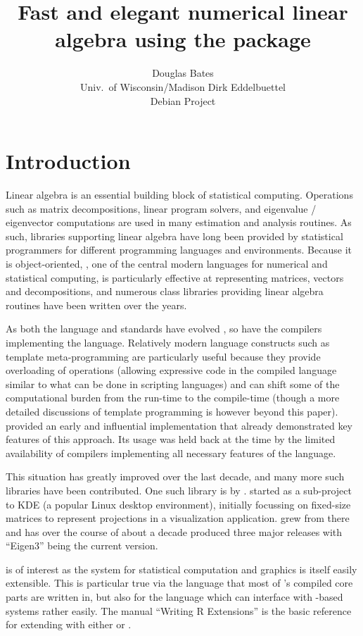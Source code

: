 \documentclass[shortnames,article]{jss}
\author{Douglas Bates\\Univ.~of Wisconsin/Madison \And Dirk Eddelbuettel\\Debian Project} %
\title{Fast and elegant numerical linear algebra using the \pkg{RcppEigen} package}
\begin{document}

\section{Introduction}
\label{sec:intro}

Linear algebra is an essential building block of statistical
computing.  Operations such as matrix decompositions, linear program
solvers, and eigenvalue / eigenvector computations are used in many
estimation and analysis routines. As such, libraries supporting linear
algebra have long been provided by statistical programmers for
different programming languages and environments.  Because it is
object-oriented, , one of the central modern languages
for numerical and statistical computing, is particularly effective at
representing matrices, vectors and decompositions, and numerous class
libraries providing linear algebra routines have been written over the
years.

As both the  language and standards have evolved
\citep{Meyers:2005:EffectiveC++,Meyers:1995:MoreEffectiveC++}, so have the
compilers implementing the language.  Relatively modern language constructs
such as template meta-programming are particularly useful because they provide
overloading of operations (allowing expressive code in the compiled language
similar to what can be done in scripting languages) and can shift some of the
computational burden from the run-time to the compile-time (though a more
detailed discussions of template programming is however beyond this
paper). \cite{Veldhuizen:1998:Blitz} provided an early and influential
implementation that already demonstrated key features of this approach.  Its
usage was held back at the time by the limited availability of
compilers implementing all necessary features of the 
language.

This situation has greatly improved over the last decade, and many more such
libraries have been contributed. One such  library is
 by \citet*{Eigen:Web}.  started as a sub-project to
KDE (a popular Linux desktop environment), initially focussing on fixed-size
matrices to represent projections in a visualization application. 
grew from there and has over the course of about a decade produced three
major releases with ``Eigen3'' being the current version.

 is of interest as the  system for statistical
computation and graphics \citep{R:Main} is itself easily extensible. This is
particular true via the  language that most of 's
compiled core parts are written in, but also for the  language
which can interface with -based systems rather easily. The manual
``Writing R Extensions'' \citep{R:Extensions} is the basic reference for
extending  with either  or .
\end{document}
